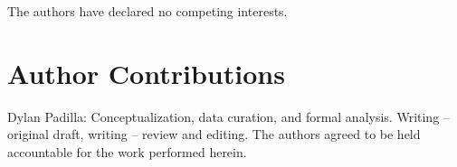 \documentclass[12pt]{article}
\begin{document}
The authors have declared no competing interests.

\section*{\normalsize Author Contributions}

Dylan Padilla: Conceptualization, data curation, and formal analysis. Writing – original  draft, writing –  review and editing. The authors agreed to be held accountable for the work performed herein.

\begin{singlespace}



\end{singlespace}

\newpage
\end{document}
